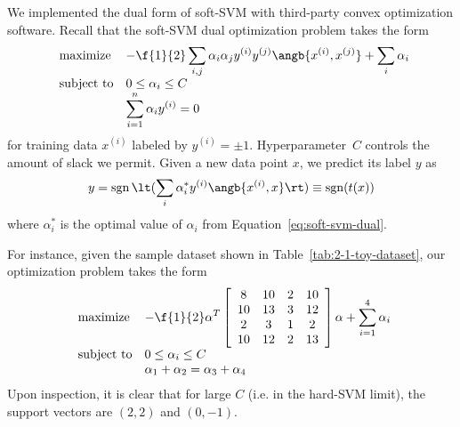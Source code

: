 \documentclass{article}
\DeclareMathOperator{\sgn}{sgn}
\newcommand{\sind}[1]{^{(#1)}}
\begin{document}
\begin{multicols}{2}
We implemented the dual form of soft-SVM
with third-party convex optimization software.
Recall that the soft-SVM dual optimization problem takes the form
\begin{equation}
    \label{eq:soft-svm-dual}
    \begin{array}{ll@{}ll}
        \text{maximize}  &\displaystyle -\f{1}{2}\sum_{i,j} \alpha_i \alpha_j y\sind{i} y\sind{j} \angb{x\sind{i}, x\sind{j}}
        +
        \sum_i \alpha_i \\
        \text{subject to}& 0 \le \alpha_i \le C\\
        & \displaystyle\sum_{i=1}^n \alpha_i y\sind{i} = 0
    \end{array}
\end{equation}
for training data $x\sind{i}$
labeled by $y\sind i = \pm 1$.
Hyperparameter~$C$ controls the amount of slack we permit.
Given a new data point $x$,
we predict its label $y$ as
\begin{equation}
    \label{eq:soft-svm-predict}
    y = \sgn\lt(\sum_i \alpha^*_i y\sind{i} \angb{x\sind{i}, x}\rt) \equiv \sgn(t(x))
\end{equation}
where $\alpha^*_i$ is the optimal value of $\alpha_i$
from Equation~\ref{eq:soft-svm-dual}.

For instance, given the sample dataset shown
in Table~\ref{tab:2-1-toy-dataset},
our optimization problem takes the form
\begin{equation}
    \label{eq:soft-svm-dual-concrete}
    \begin{array}{ll@{}ll}
        \text{maximize}  &\displaystyle -\f{1}{2}\alpha^T
        \left[
            \begin{array}{cccc}
                8 & 10 & 2 & 10 \\
                10 & 13 & 3 & 12 \\
                2 & 3 & 1 & 2 \\
                10 & 12 & 2 & 13
            \end{array}
        \right]
        \alpha
        +
        \sum_{i=1}^4 \alpha_i \\
        \text{subject to}& 0 \le \alpha_i \le C\\
        & \alpha_1 + \alpha_2 = \alpha_3 + \alpha_4
    \end{array}
\end{equation}
Upon inspection,
it is clear that for large $C$
(i.e. in the hard-SVM limit),
the support vectors are $(2,2)$ and $(0,-1)$.


\end{multicols}
\end{document}
